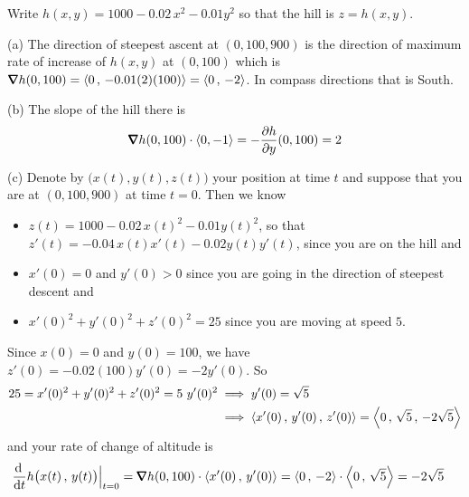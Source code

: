\begin{solution}
 Write
$h(x,y) = 1000 -0.02\,x^2-0.01 y^2$ so that the hill is $z=h(x,y)$.

(a) The direction of steepest ascent at $(0,100,900)$
is the direction of maximum rate of increase of $h(x,y)$ at $(0,100)$
which is $\vnabla h(0,100) = \llt 0\,,\, -0.01(2)(100)\rgt
                           = \llt 0\,,\,-2\rgt$. In compass
directions that is South.

(b) The slope of the hill there is
\begin{align*}
\vnabla h(0,100)\cdot\llt 0,-1\rgt
=-\pdiff{h}{y}(0,100) = 2
\end{align*}

(c) Denote by $\big(x(t),y(t),z(t)\big)$ your position at time $t$
and suppose that you are at $(0,100,900)$ at time $t=0$. 
Then we know
\begin{itemize}
\item 
$z(t) = 1000 -0.02\,x(t)^2-0.01 y(t)^2$, so that
$z'(t) = -0.04\,x(t)x'(t)-0.02 y(t)y'(t)$,
 since you are on the hill and
\item 
$x'(0)=0$ and $y'(0)>0$ since you are going in the direction of steepest
descent and
\item 
$x'(0)^2+y'(0)^2+z'(0)^2=25$ since you are moving at speed $5$.
\end{itemize}
Since $x(0)=0$ and $y(0)=100$, we have $z'(0)= -0.02(100)y'(0) = -2y'(0)$. So
\begin{align*}
25 = x'(0)^2+y'(0)^2+z'(0)^2
   =5\ y'(0)^2
&\implies y'(0) = \sqrt{5} \\
&\implies \left< x'(0)\,,\,y'(0)\,,\,z'(0) \right>
          =\left< 0\,,\, \sqrt{5}\,,\, -2\sqrt{5}\right>
\end{align*}
and your rate of change of altitude is
\begin{align*}
\diff{}{t} h\big(x(t)\,,\,y(t)\big)\Big|_{t=0}
&=\vnabla h(0,100)\cdot \llt x'(0)\,,\,y'(0) \rgt
=\llt 0\,,\,-2\rgt \cdot \llt 0\,,\, \sqrt{5}\rgt
=-2\sqrt{5}
\end{align*}
\end{solution}

